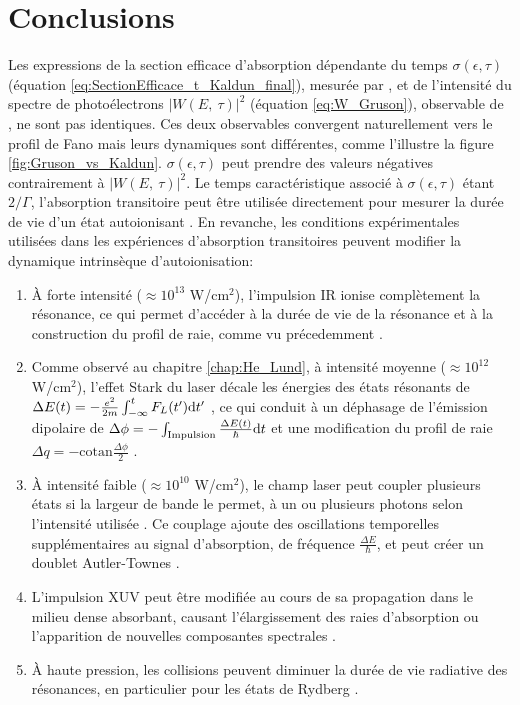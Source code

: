 \section{Conclusions}
Les expressions de la section efficace d'absorption dépendante du temps $\sigma(\epsilon,\tau)$ (équation \ref{eq:SectionEfficace_t_Kaldun_final}), mesurée par , et de l'intensité du spectre de photoélectrons $|W(E, \:  \tau)|^2$ (équation \ref{eq:W_Gruson}), observable de , ne sont pas identiques. Ces deux observables convergent naturellement vers le profil de Fano mais leurs dynamiques sont différentes, comme l'illustre la figure \ref{fig:Gruson_vs_Kaldun}. $\sigma(\epsilon,\tau)$ peut prendre des valeurs négatives contrairement à $|W(E, \:  \tau)|^2$. Le temps caractéristique associé à $\sigma(\epsilon,\tau)$ étant $2/\Gamma$, l'absorption transitoire peut être utilisée directement pour mesurer la durée de vie d'un état autoionisant . En revanche, les conditions expérimentales utilisées dans les expériences d'absorption transitoires peuvent modifier la dynamique intrinsèque d'autoionisation:
\begin{enumerate}[label=\textbullet]
\item \`{A} forte intensité ($\approx 10^{13}$ W/cm$^2$), l'impulsion IR ionise complètement la résonance, ce qui permet d'accéder à la durée de vie de la résonance et à la construction du profil de raie, comme vu précedemment .
\item Comme observé au chapitre \ref{chap:He_Lund}, à intensité moyenne ($\approx 10^{12}$ W/cm$^2$), l'effet Stark du laser décale les énergies des états résonants de $\Delta E (t) = -\frac{e^2}{2m} \int_{- \infty}^{t} F_L(t') \mathrm{d} t'$ , ce qui conduit à un déphasage de l'émission dipolaire de $\Delta \phi = - \int_{\text{Impulsion}} \frac{\Delta E (t)}{\hbar} \mathrm{d} t$ et une modification du profil de raie $\Delta q = - \text{cotan} \frac{ \Delta \phi}{2}$ .
\item \`{A} intensité faible ($\approx 10 ^{10}$ W/cm$^2$), le champ laser peut coupler plusieurs états si la largeur de bande le permet, à un ou plusieurs photons selon l'intensité utilisée . Ce couplage ajoute des oscillations temporelles supplémentaires au signal d'absorption, de fréquence $\frac{\Delta E}{\hbar}$, et peut créer un doublet Autler-Townes .
\item L'impulsion XUV peut être modifiée au cours de sa propagation dans le milieu dense absorbant, causant l'élargissement des raies d'absorption ou l'apparition de nouvelles composantes spectrales  .
\item \`{A} haute pression, les collisions peuvent diminuer la durée de vie radiative des résonances, en particulier pour les états de Rydberg .
\end{enumerate}

